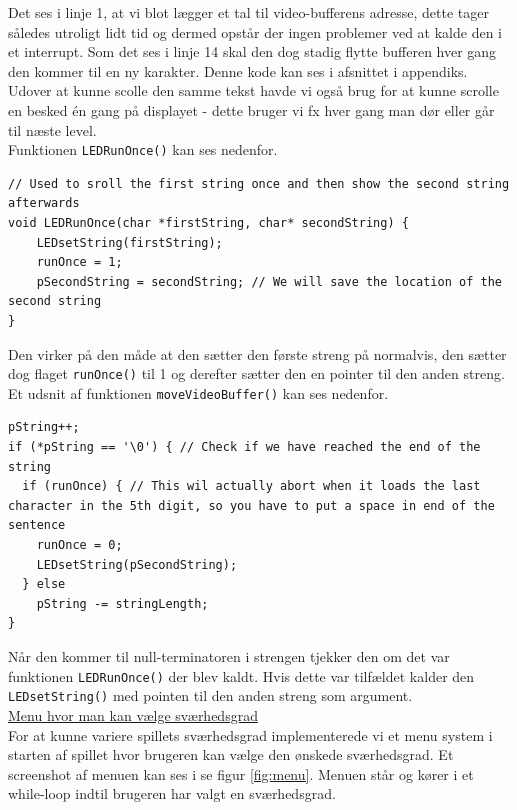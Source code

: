 Det ses i linje 1, at vi blot lægger et tal til video-bufferens adresse, dette tager således utroligt lidt tid og dermed opstår der ingen problemer ved at kalde den i et interrupt. Som det ses i linje 14 skal den dog stadig flytte bufferen hver gang den kommer til en ny karakter. Denne kode kan ses i afsnittet  i appendiks.\\

Udover at kunne scolle den samme tekst havde vi også brug for at kunne scrolle en besked én gang på displayet - dette bruger vi fx hver gang man dør eller går til næste level.\\

Funktionen \texttt{LEDRunOnce()} kan ses nedenfor.
\newpage

\begin{lstlisting}[frame=single]
// Used to sroll the first string once and then show the second string afterwards
void LEDRunOnce(char *firstString, char* secondString) {
	LEDsetString(firstString);
	runOnce = 1;
	pSecondString = secondString; // We will save the location of the second string
}
\end{lstlisting}

Den virker på den måde at den sætter den første streng på normalvis, den sætter dog flaget \texttt{runOnce()} til 1 og derefter sætter den en pointer til den anden streng.\\

Et udsnit af funktionen \texttt{moveVideoBuffer()} kan ses nedenfor.

\begin{lstlisting}[frame=single,firstnumber=12]
pString++;
if (*pString == '\0') { // Check if we have reached the end of the string
  if (runOnce) { // This wil actually abort when it loads the last character in the 5th digit, so you have to put a space in end of the sentence
    runOnce = 0;
	LEDsetString(pSecondString);
  } else
	pString -= stringLength;
}
\end{lstlisting}

Når den kommer til null-terminatoren i strengen tjekker den om det var funktionen \texttt{LEDRunOnce()} der blev kaldt. Hvis dette var tilfældet kalder den \texttt{LEDsetString()} med pointen til den anden streng som argument.\\

\underline{Menu hvor man kan vælge sværhedsgrad}\\

For at kunne variere spillets sværhedsgrad implementerede vi et menu system i starten af spillet hvor brugeren kan vælge den ønskede sværhedsgrad. Et screenshot af menuen kan ses i se figur \ref{fig:menu}. Menuen står og kører i et while-loop indtil brugeren har valgt en sværhedsgrad.

